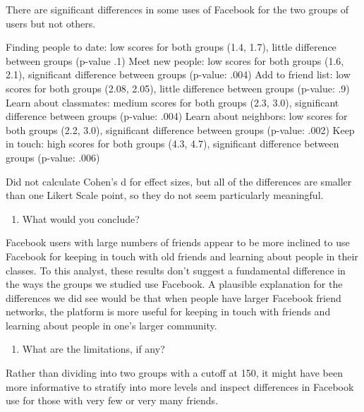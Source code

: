 \documentclass[11pt]{article}
\providecommand{\tightlist}{%
      \setlength{\itemsep}{0pt}\setlength{\parskip}{0pt}}
\begin{document}
There are significant differences in some uses of Facebook for the two
groups of users but not others.

Finding people to date: low scores for both groups (1.4, 1.7), little
difference between groups (p-value .1) Meet new people: low scores for
both groups (1.6, 2.1), significant difference between groups (p-value:
.004) Add to friend list: low scores for both groups (2.08, 2.05),
little difference between groups (p-value: .9) Learn about classmates:
medium scores for both groups (2.3, 3.0), significant difference between
groups (p-value: .004) Learn about neighbors: low scores for both groups
(2.2, 3.0), significant difference between groups (p-value: .002) Keep
in touch: high scores for both groups (4.3, 4.7), significant difference
between groups (p-value: .006)

Did not calculate Cohen's d for effect sizes, but all of the differences
are smaller than one Likert Scale point, so they do not seem
particularly meaningful.

    \begin{enumerate}
\def\labelenumi{\alph{enumi})}
\setcounter{enumi}{2}
\tightlist
\item
  What would you conclude?
\end{enumerate}

Facebook users with large numbers of friends appear to be more inclined
to use Facebook for keeping in touch with old friends and learning about
people in their classes. To this analyst, these results don't suggest a
fundamental difference in the ways the groups we studied use Facebook. A
plausible explanation for the differences we did see would be that when
people have larger Facebook friend networks, the platform is more useful
for keeping in touch with friends and learning about people in one's
larger community.

    \begin{enumerate}
\def\labelenumi{\alph{enumi})}
\setcounter{enumi}{3}
\tightlist
\item
  What are the limitations, if any?
\end{enumerate}

Rather than dividing into two groups with a cutoff at 150, it might have
been more informative to stratify into more levels and inspect
differences in Facebook use for those with very few or very many
friends.


    
    
    
    
\end{document}
